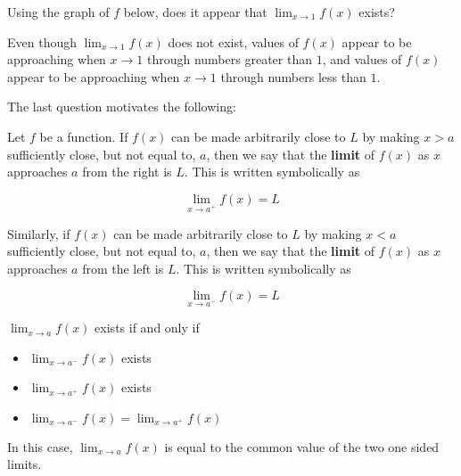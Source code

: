 \documentclass{ximera}
\begin{document}


\begin{question}
Using the graph of $f$ below, does it appear that $\lim_{x \to 1} f(x)$ exists?  


\begin{multiple-choice}
\end{multiple-choice}


\begin{question}
	Even though $\lim_{x \to 1} f(x)$ does not exist, values of $f(x)$ appear to be approaching  when $x \to 1$ through numbers greater than $1$, and values of $f(x)$ appear to be approaching  when $x \to 1$ through numbers less than $1$.
\end{question}

\end{question}

The last question motivates the following:

\begin{definition}
Let $f$ be a function.  If $f(x)$ can be made arbitrarily close to $L$ by making $x>a$ sufficiently close, but not equal to, $a$, then we say that the \textbf{limit} of $f(x)$ as $x$ approaches $a$ from the right is $L$.  This is written symbolically as

\[
\lim_{x\to a^+} f(x) = L
\]

Similarly, if $f(x)$ can be made arbitrarily close to $L$ by making $x<a$ sufficiently close, but not equal to, $a$, then we say that the \textbf{limit} of $f(x)$ as $x$ approaches $a$ from the left is $L$.  This is written symbolically as

\[
\lim_{x\to a^-} f(x) = L
\]

\end{definition}


\begin{theorem}
	$\lim_{x \to a} f(x)$ exists if and only if  
	\begin{itemize}
	   \item $\lim_{x \to a^-} f(x)$ exists
	   \item $\lim_{x \to a^+} f(x)$ exists
	   \item $\lim_{x \to a^-} f(x) = \lim_{x \to a^+} f(x)$
	\end{itemize}
	
	In this case, $\lim_{x \to a} f(x)$ is equal to the common value of the two one sided limits.
\end{theorem}
\end{document}
